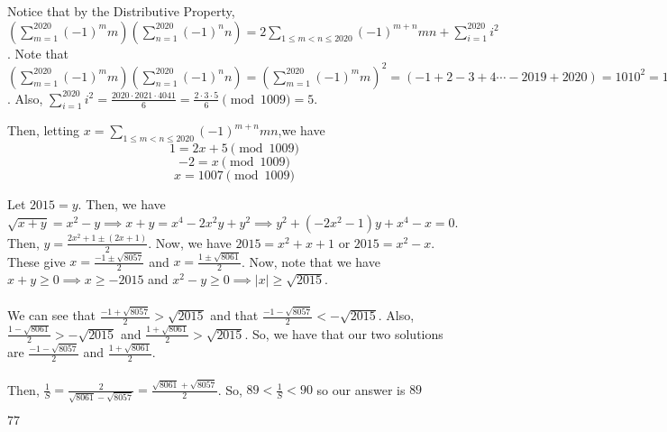\documentclass[11pt]{article}
\begin{document}
\begin{sol}
Notice that by the Distributive Property, $(\sum_{m=1}^{2020} (-1)^{m} m)(\sum_{n=1}^{2020} (-1)^{n} n) = 2\sum_{1\leq m < n\leq 2020} (-1)^{m+n}mn + \sum_{i=1}^{2020} i^2$.  Note that $(\sum_{m=1}^{2020} (-1)^{m} m)(\sum_{n=1}^{2020} (-1)^{n} n)=(\sum_{m=1}^{2020} (-1)^{m} m)^2=(-1+2-3+4\cdots -2019+2020)=1010^2=1\pmod{1009}$. Also, $\sum_{i=1}^{2020} i^2=\frac{2020\cdot 2021\cdot 4041}{6} =\frac{2\cdot 3\cdot 5}{6} \pmod{1009}=5$. 

Then, letting $x=\sum_{1\leq m < n\leq 2020} (-1)^{m+n}mn$,we have 
$$1=2x+5\pmod{1009}$$
$$-2=x\pmod{1009}$$
$$x=\boxed{1007} \pmod{1009}$$
\end{sol}


\begin{sol}
Let $2015=y$. Then, we have $\sqrt{x+y}=x^2-y\implies x+y=x^4-2x^2y+y^2\implies y^2+(-2x^2-1)y+x^4-x=0$. Then, $y=\frac{2x^2+1 \pm (2x+1)}{2}$. Now, we have $2015=x^2+x+1$ or $2015=x^2-x$. These give $x=\frac{-1 \pm \sqrt{8057}}{2}$ and $x=\frac{1 \pm \sqrt{8061}}{2}$. Now, note that we have $x+y\ge 0 \implies x \ge -2015$ and $x^2-y\ge 0\implies |x|\ge \sqrt{2015}$. \\
\\
We can see that $\frac{-1 + \sqrt{8057}}{2}>\sqrt{2015}$ and that $\frac{-1-\sqrt{8057}}{2} < -\sqrt{2015}$. Also, $\frac{1-\sqrt{8061}}{2} > - \sqrt{2015}$ and $\frac{1+\sqrt{8061}}{2} > \sqrt{2015}$. So, we have that our two solutions are $\frac{-1-\sqrt{8057}}{2}$ and $\frac{1+\sqrt{8061}}{2}$. \\
\\
Then, $\frac{1}{S}=\frac{2}{\sqrt{8061}-\sqrt{8057}}=\frac{\sqrt{8061}+\sqrt{8057}}{2}$. So, $89 < \frac{1}{S} < 90$ so our answer is $\boxed{89}$
\end{sol}


\begin{sol}
$\boxed{77}$
\end{sol}
\end{document}

